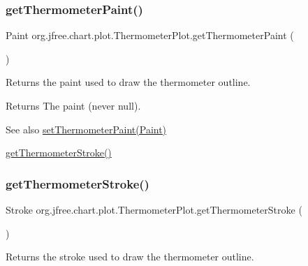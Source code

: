 \subsubsection{\texorpdfstring{get\+Thermometer\+Paint()}{getThermometerPaint()}}
{\footnotesize\ttfamily Paint org.\+jfree.\+chart.\+plot.\+Thermometer\+Plot.\+get\+Thermometer\+Paint (\begin{DoxyParamCaption}{ }\end{DoxyParamCaption})}

Returns the paint used to draw the thermometer outline.

\begin{DoxyReturn}{Returns}
The paint (never {\ttfamily null}).
\end{DoxyReturn}
\begin{DoxySeeAlso}{See also}
\mbox{\hyperlink{classorg_1_1jfree_1_1chart_1_1plot_1_1_thermometer_plot_a3d8ade5824212540094354b9794b0dba}{set\+Thermometer\+Paint(\+Paint)}} 

\mbox{\hyperlink{classorg_1_1jfree_1_1chart_1_1plot_1_1_thermometer_plot_a88292665456e7753129e4fa88053ef07}{get\+Thermometer\+Stroke()}} 
\end{DoxySeeAlso}
\mbox{\label{classorg_1_1jfree_1_1chart_1_1plot_1_1_thermometer_plot_a88292665456e7753129e4fa88053ef07}} 
\subsubsection{\texorpdfstring{get\+Thermometer\+Stroke()}{getThermometerStroke()}}
{\footnotesize\ttfamily Stroke org.\+jfree.\+chart.\+plot.\+Thermometer\+Plot.\+get\+Thermometer\+Stroke (\begin{DoxyParamCaption}{ }\end{DoxyParamCaption})}

Returns the stroke used to draw the thermometer outline.

